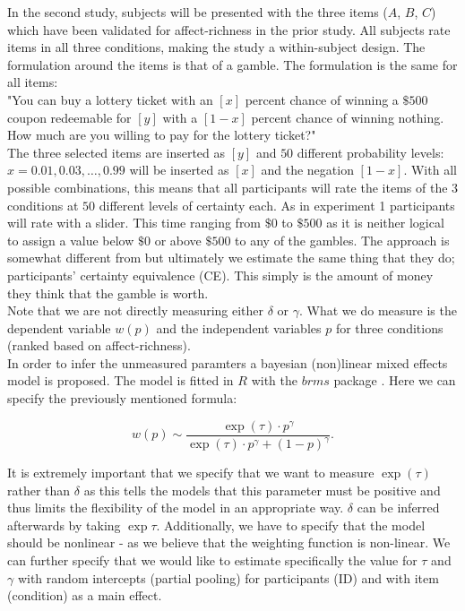 \documentclass[12pt]{article}
\begin{document}
\vspace{3mm}

In the second study, subjects will be presented
with the three items ($A$,  $B$,  $C$)
which have been validated
for affect-richness in the prior study. All
subjects rate items in all three conditions,
making the study a within-subject design.
The formulation
around the items is that of a gamble.
The formulation is the same
for all items: \\

"You can buy a lottery ticket with an $[x]$
percent chance of winning a $\$500$ coupon
redeemable for $[y]$ with a $[1-x]$ percent
chance of winning nothing. How much are you
willing to pay for the lottery ticket?" \\

The three selected items are inserted as $[y]$
and $50$ different probability levels:
$x = 0.01, 0.03, \ldots, 0.99$ will be
inserted as $[x]$ and the negation $[1-x]$.
With all
possible combinations, this means that
all participants will rate the items of
the $3$ conditions
at $50$ different levels of certainty each.
As in experiment 1 participants will rate
with a slider. This time ranging from
$\$0$ to $\$500$ as it is neither logical
to assign a value below $\$0$ or above
$\$500$ to any of the gambles.
The approach is somewhat
different from \textcite{gonzalez1999shape}
but ultimately we estimate the same thing that
they do; participants' certainty equivalence (CE).
This simply is the amount of money they think
that the gamble is worth. \\

Note that we are not directly measuring either
$\delta$ or $\gamma$. What we do measure is the
dependent variable $w(p)$ and the independent
variables $p$ for three conditions (ranked
based on affect-richness).  \\

In order to infer the
unmeasured paramters a bayesian (non)linear
mixed effects model is proposed. The model
is fitted in $R$ \autocite{rcore}
with the  $brms$ package \autocite{brms}.
Here we can specify the previously
mentioned formula:

 \[
	 w(p) \sim \frac{\exp({\tau})\cdot p^{\gamma}}
	 {\exp({\tau})\cdot p^{\gamma}+(1-p)^{\gamma}}
.\]

It is extremely important that we specify
that we want to measure $\exp(\tau)$ rather
than  $\delta$ as this tells the models that
this parameter must be positive and thus
limits the flexibility of the model in an
appropriate way.  $\delta$ can be inferred
afterwards by taking  $\exp{\tau}$.
Additionally, we have to specify that the model should
be nonlinear - as we believe that the weighting
function is non-linear.
We can further specify that we would like to
estimate specifically the value for $\tau$
and $\gamma$ with random intercepts (partial pooling)
for participants (ID) and with item (condition)
as a main
effect.
\end{document}
